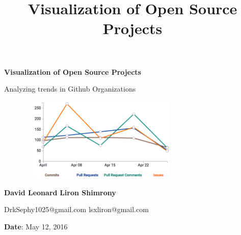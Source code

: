\documentclass{article}
\title{Visualization of Open Source Projects}
\begin{document}
\begin{titlepage}
    \begin{center}
        \vspace*{2.5cm}
        {\bf Visualization of Open Source Projects}
        
        \vspace{0.5cm}
        
        Analyzing trends in Github Organizations
        
        \vspace{2.0cm}
        
        \begin{figure}[h!]
	  \centering
	  \includegraphics[height=4cm, width=8cm]{cover}
	  \end{figure}

        
        \vspace{2.0cm}        
        
        \hspace{1.5cm} \textbf{David Leonard} \hspace{2.5cm} \textbf{Liron Shimrony}
        
        \vspace{0.5cm}
        \hspace{1.1cm} DrkSephy1025@gmail.com \hspace{1.5cm} lsxliron@gmail.com
	
		\vspace{1.5cm} 
	\textbf{Date}: May 12, 2016
	
	\vspace{1.5cm}
	
	\begin{figure}[b]
          \centering
          \qquad
      \end{figure}
        

\end{center}
\end{titlepage}
\end{document}
